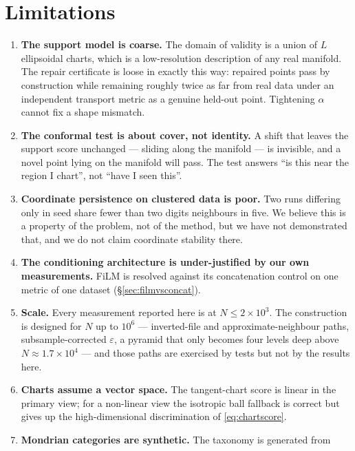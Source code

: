 \documentclass[12pt]{iopart}
\theoremstyle{definition}
\theoremstyle{plain}
\theoremstyle{remark}
\begin{document}
\section{Limitations}
\label{sec:limitations}

\begin{enumerate}[leftmargin=*]
\item \textbf{The support model is coarse.} The domain of validity is a union
  of $L$ ellipsoidal charts, which is a low-resolution description of any real
  manifold. The repair certificate is loose in exactly this way: repaired points
  pass by construction while remaining roughly twice as far from real data under
  an independent transport metric as a genuine held-out point. Tightening
  $\alpha$ cannot fix a shape mismatch.
\item \textbf{The conformal test is about cover, not identity.} A shift that
  leaves the support score unchanged --- sliding along the manifold --- is
  invisible, and a novel point lying on the manifold will pass. The test answers
  ``is this near the region I chart'', not ``have I seen this''.
\item \textbf{Coordinate persistence on clustered data is poor.} Two runs
  differing only in seed share fewer than two digits neighbours in five. We
  believe this is a property of the problem, not of the method, but we have not
  demonstrated that, and we do not claim coordinate stability there.
\item \textbf{The conditioning architecture is under-justified by our own
  measurements.} FiLM is resolved against its concatenation control on one
  metric of one dataset (\S\ref{sec:filmvsconcat}).
\item \textbf{Scale.} Every measurement reported here is at $N\le2\times10^3$.
  The construction is designed for $N$ up to $10^6$ --- inverted-file and
  approximate-neighbour paths, subsample-corrected $\varepsilon$, a pyramid that
  only becomes four levels deep above $N\approx1.7\times10^4$ --- and those
  paths are exercised by tests but not by the results here.
\item \textbf{Charts assume a vector space.} The tangent-chart score is linear
  in the primary view; for a non-linear view the isotropic ball fallback is
  correct but gives up the high-dimensional discrimination of
  \eqref{eq:chartscore}.
\item \textbf{Mondrian categories are synthetic.} The taxonomy is generated from

\end{enumerate}
\end{document}
